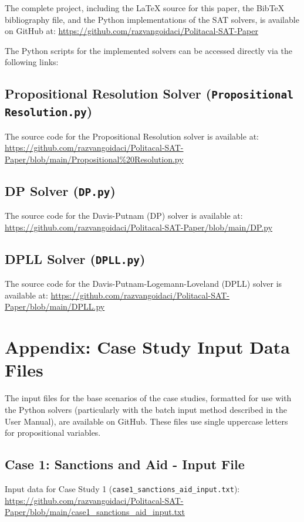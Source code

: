 \documentclass[11pt, a4paper]{article}
\begin{document}
The complete project, including the LaTeX source for this paper, the BibTeX bibliography file, and the Python implementations of the SAT solvers, is available on GitHub at:
\url{https://github.com/razvangoidaci/Politacal-SAT-Paper}

The Python scripts for the implemented solvers can be accessed directly via the following links:

\subsection{Propositional Resolution Solver (\texttt{Propositional Resolution.py})} \label{app:resolution_code_link}
The source code for the Propositional Resolution solver is available at:
\url{https://github.com/razvangoidaci/Politacal-SAT-Paper/blob/main/Propositional%20Resolution.py}

\subsection{DP Solver (\texttt{DP.py})} \label{app:dp_code_link}
The source code for the Davis-Putnam (DP) solver is available at:
\url{https://github.com/razvangoidaci/Politacal-SAT-Paper/blob/main/DP.py}

\subsection{DPLL Solver (\texttt{DPLL.py})} \label{app:dpll_code_link}
The source code for the Davis-Putnam-Logemann-Loveland (DPLL) solver is available at:
\url{https://github.com/razvangoidaci/Politacal-SAT-Paper/blob/main/DPLL.py}

\section{Appendix: Case Study Input Data Files} \label{app:input_data}
The input files for the base scenarios of the case studies, formatted for use with the Python solvers (particularly with the batch input method described in the User Manual), are available on GitHub. These files use single uppercase letters for propositional variables.

\subsection{Case 1: Sanctions and Aid - Input File} \label{app:case1_input_link}
Input data for Case Study 1 (\texttt{case1\_sanctions\_aid\_input.txt}):
\url{https://github.com/razvangoidaci/Politacal-SAT-Paper/blob/main/case1_sanctions_aid_input.txt}
\end{document}
